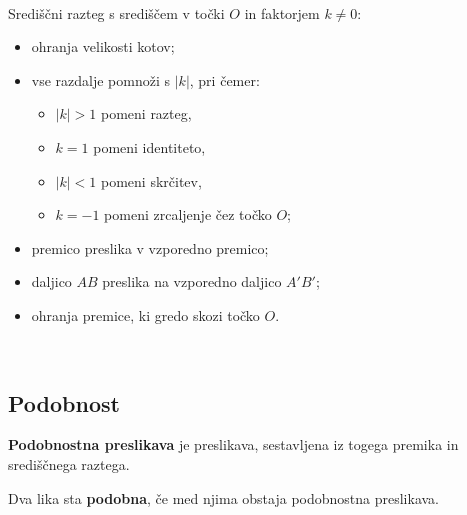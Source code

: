         
        ~

            Središčni razteg s središčem v točki $O$ in faktorjem $k\neq 0$:
                \begin{itemize}
                    \item ohranja velikosti kotov;
                    \item vse razdalje pomnoži s $|k|$, pri čemer:
                        \begin{itemize}
                            \item $|k|>1$ pomeni razteg,
                            \item $k=1$ pomeni identiteto,
                            \item $|k|<1$ pomeni skrčitev,
                            \item $k=-1$ pomeni zrcaljenje čez točko $O$;
                        \end{itemize}
                    \item premico preslika v vzporedno premico;
                    \item daljico $AB$ preslika na vzporedno daljico $A'B'$;
                    \item ohranja premice, ki gredo skozi točko $O$.
                \end{itemize}
            
        

~\\
        
            \subsection*{Podobnost}


            \begin{definicija}
                \textbf{Podobnostna preslikava} je preslikava, sestavljena iz togega premika in središčnega raztega.
            \end{definicija}

            \begin{definicija}
                Dva lika sta \textbf{podobna}, če med njima obstaja podobnostna preslikava.
            \end{definicija}

